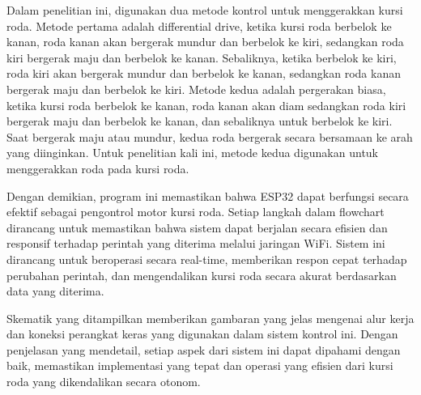 Dalam penelitian ini, digunakan dua metode kontrol untuk menggerakkan kursi roda. Metode pertama adalah differential drive, ketika kursi roda berbelok ke kanan, roda kanan akan bergerak mundur dan berbelok ke kiri, sedangkan roda kiri bergerak maju dan berbelok ke kanan. Sebaliknya, ketika berbelok ke kiri, roda kiri akan bergerak mundur dan berbelok ke kanan, sedangkan roda kanan bergerak maju dan berbelok ke kiri. Metode kedua adalah pergerakan biasa, ketika kursi roda berbelok ke kanan, roda kanan akan diam sedangkan roda kiri bergerak maju dan berbelok ke kanan, dan sebaliknya untuk berbelok ke kiri. Saat bergerak maju atau mundur, kedua roda bergerak secara bersamaan ke arah yang diinginkan. Untuk penelitian kali ini, metode kedua digunakan untuk menggerakkan roda pada kursi roda.

Dengan demikian, program ini memastikan bahwa ESP32 dapat berfungsi secara efektif sebagai pengontrol motor kursi roda. Setiap langkah dalam flowchart dirancang untuk memastikan bahwa sistem dapat berjalan secara efisien dan responsif terhadap perintah yang diterima melalui jaringan WiFi. Sistem ini dirancang untuk beroperasi secara real-time, memberikan respon cepat terhadap perubahan perintah, dan mengendalikan kursi roda secara akurat berdasarkan data yang diterima.

Skematik yang ditampilkan memberikan gambaran yang jelas mengenai alur kerja dan koneksi perangkat keras yang digunakan dalam sistem kontrol ini. Dengan penjelasan yang mendetail, setiap aspek dari sistem ini dapat dipahami dengan baik, memastikan implementasi yang tepat dan operasi yang efisien dari kursi roda yang dikendalikan secara otonom. \parencite{ekatama2024perancangan}

